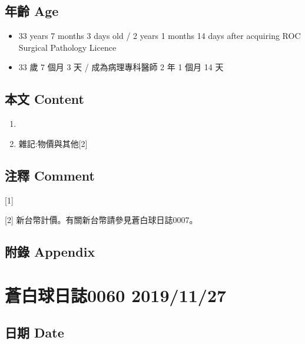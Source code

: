 \documentclass[
]{article}
\providecommand{\tightlist}{%
  \setlength{\itemsep}{0pt}\setlength{\parskip}{0pt}}
\begin{document}
\hypertarget{ux5e74ux9f61-age-25}{%
\subsection{年齡 Age}\label{ux5e74ux9f61-age-25}}

\begin{itemize}
\tightlist
\item
  33 years 7 months 3 days old / 2 years 1 months 14 days after
  acquiring ROC Surgical Pathology Licence
\item
  33 歲 7 個月 3 天 / 成為病理專科醫師 2 年 1 個月 14 天
\end{itemize}

\hypertarget{ux672cux6587-content-25}{%
\subsection{本文 Content}\label{ux672cux6587-content-25}}

\begin{enumerate}
\def\labelenumi{\arabic{enumi}.}
\item
\item
  雜記:物價與其他{[}2{]}
\end{enumerate}

\hypertarget{ux6ce8ux91cb-comment-25}{%
\subsection{注釋 Comment}\label{ux6ce8ux91cb-comment-25}}

{[}1{]}

{[}2{]} 新台幣計價。有關新台幣請參見蒼白球日誌0007。

\hypertarget{ux9644ux9304-appendix-25}{%
\subsection{附錄 Appendix}\label{ux9644ux9304-appendix-25}}

\hypertarget{ux84bcux767dux7403ux65e5ux8a8c0060-20191127}{%
\section{蒼白球日誌0060
2019/11/27}\label{ux84bcux767dux7403ux65e5ux8a8c0060-20191127}}

\hypertarget{ux65e5ux671f-date-26}{%
\subsection{日期 Date}\label{ux65e5ux671f-date-26}}
\end{document}

